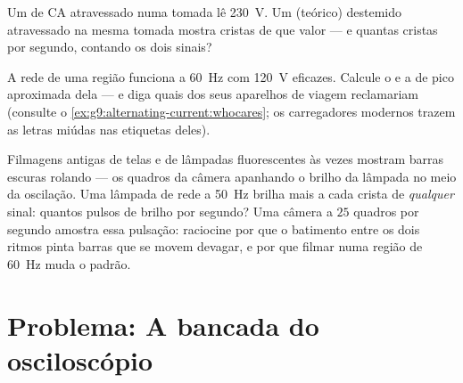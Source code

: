 \begin{exercise}[$\star\star$]\label{exo:g9:alternating-current:10}
Um  de CA atravessado numa tomada lê \qty{230}{V}. Um
 (teórico) destemido atravessado na mesma tomada mostra
cristas de que valor --- e quantas cristas por segundo, contando os
dois sinais?
\end{exercise}

\begin{exercise}[$\star\star$]\label{exo:g9:alternating-current:11}
A rede de uma região funciona a \qty{60}{Hz} com \qty{120}{V}
eficazes. Calcule o  e a  de pico aproximada dela --- e
diga quais dos seus aparelhos de viagem reclamariam (consulte o
\cref{ex:g9:alternating-current:whocares}; os carregadores modernos
trazem as letras miúdas nas etiquetas deles).
\end{exercise}

\begin{exercise}[$\star\star\star$]\label{exo:g9:alternating-current:12}
Filmagens antigas de telas e de lâmpadas fluorescentes às vezes
mostram barras escuras rolando --- os quadros da câmera apanhando o
brilho da lâmpada no meio da oscilação. Uma lâmpada de rede a
\qty{50}{Hz} brilha mais a cada crista de \emph{qualquer} sinal:
quantos pulsos de brilho por segundo? Uma câmera a $25$ quadros por
segundo amostra essa pulsação: raciocine por que o batimento entre os
dois ritmos pinta barras que se movem devagar, e por que filmar numa
região de \qty{60}{Hz} muda o padrão.
\end{exercise}

\section{Problema: A bancada do osciloscópio}


